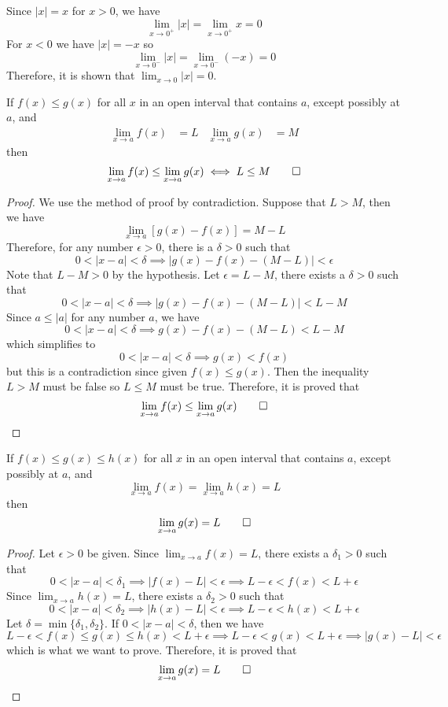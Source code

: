 \begin{solution}
    Since \(|x|=x\) for \(x>0\), we have
    \[\lim_{x\to 0^+}|x|=\lim_{x\to 0^+}x=0\]
    For \(x<0\) we have \(|x|=-x\) so
    \[\lim_{x\to 0^-}|x|=\lim_{x\to 0^-}(-x)=0\]
    Therefore, it is shown that \(\displaystyle{\lim_{x\to 0}|x|=0}\).
\end{solution}
\begin{theorem}
    If \(f(x)\leq g(x)\) for all \(x\) in an open interval that contains \(a\),
    except possibly at \(a\), and
    \begin{align*}
        \lim_{x\to a}f(x)&=L&\lim_{x\to a}g(x)&=M
    \end{align*}
    then \[\lim_{x\to a}f(x)\leq\lim_{x\to a}g(x)\iff L\leq M\qedhere\]
\end{theorem}
\begin{proof}
    We use the method of proof by contradiction.
    Suppose  that \(L>M\), then we have
    \[\lim_{x\to a}[g(x)-f(x)]=M-L\]
    Therefore, for any number \(\epsilon>0\), there is a \(\delta>0\) such that
    \[0<|x-a|<\delta\implies|g(x)-f(x)-(M-L)|<\epsilon\]
    Note that \(L-M>0\) by the hypothesis.
    Let \(\epsilon=L-M\), there exists a \(\delta>0\) such that
    \[0<|x-a|<\delta\implies|g(x)-f(x)-(M-L)|<L-M\]
    Since \(a\leq|a|\) for any number \(a\), we have
    \[0<|x-a|<\delta\implies g(x)-f(x)-(M-L)<L-M\]
    which simplifies to
    \[0<|x-a|<\delta\implies g(x)<f(x)\]
    but this is a contradiction since given \(f(x)\leq g(x)\).
    Then the inequality \(L>M\) must be false so \(L\leq M\) must be true.
    Therefore, it is proved that
    \[\lim_{x\to a}f(x)\leq\lim_{x\to a}g(x)\qedhere\]
\end{proof}
\begin{theorem}
    If \(f(x)\leq g(x)\leq h(x)\) for all \(x\) in an open interval that
    contains \(a\), except possibly at \(a\), and
    \[\lim_{x\to a}f(x)=\lim_{x\to a}h(x)=L\] then \[\lim_{x\to a}g(x)=L\qedhere\]
\end{theorem}
\begin{proof}
    Let \(\epsilon>0\) be given. Since \(\lim_{x\to a}f(x)=L\), there exists a
    \(\delta_1>0\) such that
    \[0<|x-a|<\delta_1\implies|f(x)-L|<\epsilon\implies L-\epsilon<f(x)<L+\epsilon\]
    Since \(\lim_{x\to a}h(x)=L\), there exists a \(\delta_2>0\) such that
    \[0<|x-a|<\delta_2\implies|h(x)-L|<\epsilon\implies L-\epsilon<h(x)<L+\epsilon\]
    Let \(\delta=\min\{\delta_1,\delta_2\}\). If \(0<|x-a|<\delta\), then we have
    \[L-\epsilon<f(x)\leq g(x)\leq h(x)<L+\epsilon\implies L-\epsilon<g(x)<L+\epsilon
    \implies|g(x)-L|<\epsilon\] which is what we want to prove.
    Therefore, it is proved that \[\lim_{x\to a}g(x)=L\qedhere\]
\end{proof}
